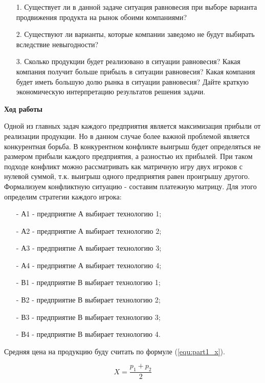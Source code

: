 \begin{enumerate}
  \item[1.] Существует ли в данной задаче ситуация равновесия при выборе варианта продвижения продукта на рынок обоими компаниями?
  \item[2.] Существуют ли варианты, которые компании заведомо не будут выбирать вследствие невыгодности?
  \item[3.] Сколько продукции будет реализовано в ситуации равновесия?
  Какая компания получит больше прибыль в ситуации равновесия?
  Какая компания будет иметь большую долю рынка в ситуации равновесия?
  Дайте краткую экономическую интерпретацию результатов решения задачи.
\end{enumerate}

\newpage

\begin{center}
  \textbf{Ход работы}
\end{center}

Одной из главных задач каждого предприятия является максимизация прибыли от реализации продукции.
Но в данном случае более важной проблемой является конкурентная борьба.
В конкурентном конфликте выигрыш будет определяться не размером прибыли каждого предприятия, а разностью их прибылей.
При таком подходе конфликт можно рассматривать как матричную игру двух игроков с нулевой суммой, т.к. выигрыш одного предприятия равен проигрышу другого.
Формализуем конфликтную ситуацию - составим платежную матрицу.
Для этого определим стратегии каждого игрока:
\begin{enumerate}
  \item[-] А1 - предприятие А выбирает технологию 1;
  \item[-] А2 - предприятие А выбирает технологию 2;
  \item[-] А3 - предприятие А выбирает технологию 3;
  \item[-] А4 - предприятие А выбирает технологию 4;
  \item[-] В1 - предприятие В выбирает технологию 1;
  \item[-] В2 - предприятие В выбирает технологию 2;
  \item[-] В3 - предприятие В выбирает технологию 3;
  \item[-] В4 - предприятие В выбирает технологию 4.
\end{enumerate}

Средняя цена на продукцию буду считать по формуле (\ref{equ:part1_x}).

\begin{equation} \label{equ:part1_x}
  X = \frac{p_1 + p_2}{2}
\end{equation}

